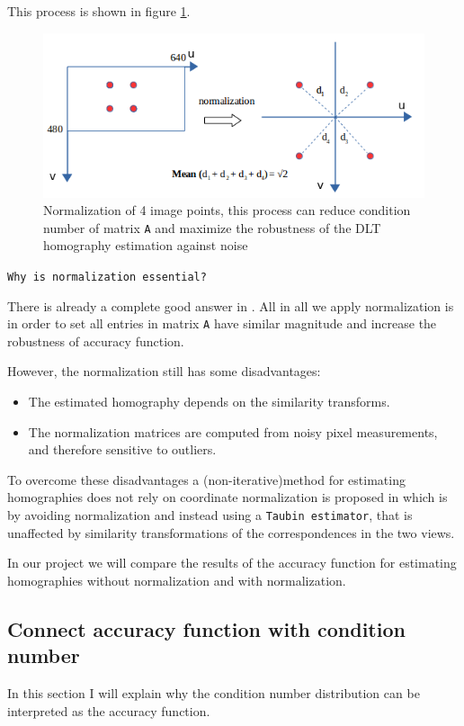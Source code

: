 This process is shown in figure \ref{fig:normalization}.
\begin{figure}[h]
\centering
\includegraphics[scale=0.8]{./fig/normalization.png}
\caption{Normalization of 4 image points, this process can reduce condition number of matrix \texttt{A} and maximize the robustness of the DLT
homography estimation against noise}  
\label{fig:normalization}
\end{figure}

\texttt{Why is normalization essential?} %

There is already a complete good answer in \cite{hartley2000multiple}. All in all we apply normalization is in order to set all entries in matrix \texttt{A} have similar magnitude and increase the robustness of accuracy function.

However, the normalization still has some disadvantages:
\begin{itemize}
\item The estimated homography depends on the similarity transforms.
\item The normalization matrices are computed from
noisy pixel measurements, and therefore sensitive to outliers.
\end{itemize}

To overcome these disadvantages a (non-iterative)method for estimating homographies does not
rely on coordinate normalization is proposed in \cite{rangarajan2009estimating} which is by avoiding normalization and instead using a \texttt{Taubin estimator}, that is unaffected by similarity transformations of the correspondences in the two views. 

In our project we will compare the results of the accuracy function for estimating homographies without normalization and with normalization.

\subsection{Connect accuracy function with condition number}
In this section I will explain why the condition number distribution can be interpreted as the accuracy function.\\

